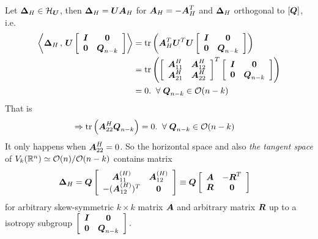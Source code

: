 \documentclass[11pt]{article}
\begin{document}
Let $\boldsymbol{\Delta}_{H} \in \mathcal{H}_{\boldsymbol{U}}$, then $\boldsymbol{\Delta}_{H}  = \boldsymbol{U}\boldsymbol{A}_{H}$ for $\boldsymbol{A}_{H} = -\boldsymbol{A}_{H}^{T}$ and $\boldsymbol{\Delta}_{H}$ orthogonal to $[\boldsymbol{Q}]$, i.e. 
\begin{align*}
\left\langle \boldsymbol{\Delta}_{H}\,,\,  \boldsymbol{U}\left[\begin{array}{cc}
\boldsymbol{I} & \boldsymbol{0} \\ 
\boldsymbol{0} & \boldsymbol{Q}_{n-k}
\end{array}\right]  \right\rangle
&= \mathrm{tr}\left( \boldsymbol{A}_{H}^{T}\boldsymbol{U}^{T}\boldsymbol{U}\left[\begin{array}{cc}
\boldsymbol{I} & \boldsymbol{0} \\ 
\boldsymbol{0} & \boldsymbol{Q}_{n-k}
\end{array}\right]   \right)\\
&= \mathrm{tr}\left( \left[\begin{array}{cc}
\boldsymbol{A}^{H}_{11} & \boldsymbol{A}^{H}_{12} \\ 
\boldsymbol{A}^{H}_{21} & \boldsymbol{A}^{H}_{22}
\end{array}\right]^{T}\left[\begin{array}{cc}
\boldsymbol{I} & \boldsymbol{0} \\ 
\boldsymbol{0} & \boldsymbol{Q}_{n-k}
\end{array}\right]   \right)\\
&=0. \;\; \forall \; \boldsymbol{Q}_{n-k}\in {\mathcal O}(n-k)
\end{align*}
That is 
\begin{align*}
\Rightarrow \mathrm{tr}\left( \boldsymbol{A}^{H}_{22}\boldsymbol{Q}_{n-k} \right) &= 0. \;\; \forall \; \boldsymbol{Q}_{n-k}\in {\mathcal O}(n-k)
\end{align*}
It only happens when $\boldsymbol{A}^{H}_{22} = 0$.   
So the horizontal space and also \emph{the tangent space} of $V_{k}({\mathbb R}^{n}) \simeq {\mathcal O}(n)/{\mathcal O}(n-k)$ contains matrix
\begin{align*}
\boldsymbol{\Delta}_{H}  &= \boldsymbol{Q}\left[\begin{array}{cc}
\boldsymbol{A}_{11}^{(H)} & \boldsymbol{A}_{12}^{(H)}\\ 
-(\boldsymbol{A}_{12}^{(H)})^{T}& \boldsymbol{0}
\end{array} \right] \equiv \boldsymbol{Q}\left[\begin{array}{cc}
\boldsymbol{A} & -\boldsymbol{R}^{T} \\ 
\boldsymbol{R}& \boldsymbol{0}
\end{array} \right] 
\end{align*} for arbitrary skew-symmetric $k \times k$ matrix $\boldsymbol{A}$ and arbitrary matrix $\boldsymbol{R}$
up to a isotropy subgroup $\left[\begin{array}{cc}
\boldsymbol{I} & \boldsymbol{0} \\ 
\boldsymbol{0} & \boldsymbol{Q}_{n-k}
\end{array}\right].$
\end{document}

